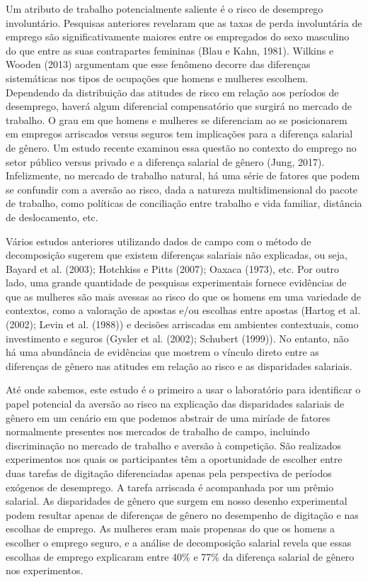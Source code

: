\documentclass[a4paper,12pt]{article}[abntex2]
\begin{document}
Um atributo de trabalho potencialmente saliente é o risco de desemprego involuntário. Pesquisas anteriores revelaram que as taxas de perda involuntária de emprego são significativamente maiores entre os empregados do sexo masculino do que entre as suas contrapartes femininas (Blau e Kahn, 1981). Wilkins e Wooden (2013) argumentam que esse fenômeno decorre das diferenças sistemáticas nos tipos de ocupações que homens e mulheres escolhem. Dependendo da distribuição das atitudes de risco em relação aos períodos de desemprego, haverá algum diferencial compensatório que surgirá no mercado de trabalho. O grau em que homens e mulheres se diferenciam ao se posicionarem em empregos arriscados versus seguros tem implicações para a diferença salarial de gênero. Um estudo recente examinou essa questão no contexto do emprego no setor público versus privado e a diferença salarial de gênero (Jung, 2017). Infelizmente, no mercado de trabalho natural, há uma série de fatores que podem se confundir com a aversão ao risco, dada a natureza multidimensional do pacote de trabalho, como políticas de conciliação entre trabalho e vida familiar, distância de deslocamento, etc.

Vários estudos anteriores utilizando dados de campo com o método de decomposição sugerem que existem diferenças salariais não explicadas, ou seja, Bayard et al. (2003); Hotchkiss e Pitts (2007); Oaxaca (1973), etc. Por outro lado, uma grande quantidade de pesquisas experimentais fornece evidências de que as mulheres são mais avessas ao risco do que os homens em uma variedade de contextos, como a valoração de apostas e/ou escolhas entre apostas (Hartog et al. (2002); Levin et al. (1988)) e decisões arriscadas em ambientes contextuais, como investimento e seguros (Gysler et al. (2002); Schubert (1999)). No entanto, não há uma abundância de evidências que mostrem o vínculo direto entre as diferenças de gênero nas atitudes em relação ao risco e as disparidades salariais.

Até onde sabemos, este estudo é o primeiro a usar o laboratório para identificar o papel potencial da aversão ao risco na explicação das disparidades salariais de gênero em um cenário em que podemos abstrair de uma miríade de fatores normalmente presentes nos mercados de trabalho de campo, incluindo discriminação no mercado de trabalho e aversão à competição. São realizados experimentos nos quais os participantes têm a oportunidade de escolher entre duas tarefas de digitação diferenciadas apenas pela perspectiva de períodos exógenos de desemprego. A tarefa arriscada é acompanhada por um prêmio salarial. As disparidades de gênero que surgem em nosso desenho experimental podem resultar apenas de diferenças de gênero no desempenho de digitação e nas escolhas de emprego. As mulheres eram mais propensas do que os homens a escolher o emprego seguro, e a análise de decomposição salarial revela que essas escolhas de emprego explicaram entre 40\% e 77\% da diferença salarial de gênero nos experimentos.
\end{document}
